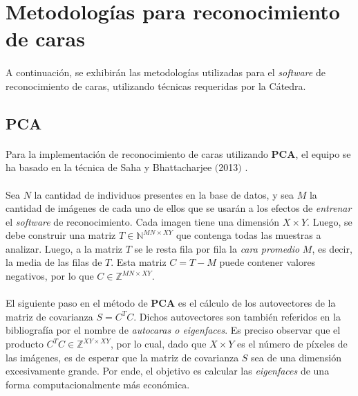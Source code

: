 \documentclass[12pt, twocolumn]{article}
\begin{document}
	\section{Metodologías para reconocimiento de caras}
	
	\paragraph{} A continuación, se exhibirán las metodologías utilizadas para el \textit{software} de reconocimiento de caras, utilizando técnicas requeridas por la Cátedra. 	
	
	\subsection{PCA}
	
	\paragraph{} Para la implementación de reconocimiento de caras utilizando \textbf{PCA}, el equipo se ha basado en la técnica de Saha y Bhattacharjee $($2013$)$ \cite{PCA}.
	
	\paragraph{} Sea $N$ la cantidad de individuos presentes en la base de datos, y sea $M$ la cantidad de imágenes de cada uno de ellos que se usarán a los efectos de \textit{entrenar} el \textit{software} de reconocimiento. Cada imagen tiene una dimensión $X\times Y$. Luego, se debe construir una matriz $T \in \mathbb{N}^{MN\times XY}$ que contenga todas las muestras a analizar. Luego, a la matriz $T$ se le resta fila por fila la \textit{cara promedio} $M$, es decir, la media de las filas de $T$. Esta matriz $C = T - M$ puede contener valores negativos, por lo que $C \in \mathbb{Z}^{MN\times XY}$.
	
	\paragraph{} El siguiente paso en el método de \textbf{PCA} es el cálculo de los autovectores de la matriz de covarianza $S = C^{T}C$. Dichos autovectores son también referidos en la bibliografía por el nombre de \textit{autocaras o eigenfaces}. Es preciso observar que el producto $C^{T}C \in \mathbb{Z}^{XY\times XY}$, por lo cual, dado que $X\times Y$ es el número de píxeles de las imágenes, es de esperar que la matriz de covarianza $S$ sea de una dimensión excesivamente grande. Por ende, el objetivo es calcular las \textit{eigenfaces} de una forma computacionalmente más económica.
	
\end{document}
